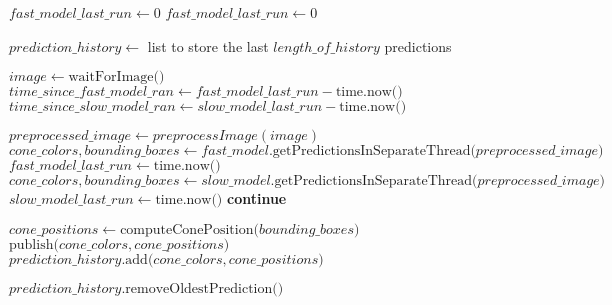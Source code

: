 
  \Input
  \EndInput
\State $fast\_model\_last\_run \gets \text{0}$
\State $fast\_model\_last\_run \gets \text{0}$

\State $prediction\_history \gets$ list to store the last $length\_of\_history$ predictions

	\State $image \gets \text{waitForImage()}$
	\State $time\_since\_fast\_model\_ran \gets fast\_model\_last\_run - \text{time.now()}$
	\State $time\_since\_slow\_model\_ran \gets slow\_model\_last\_run - \text{time.now()}$

    	\State $preprocessed\_image \gets preprocessImage(image)$
    	\State $cone\_colors, bounding\_boxes \gets fast\_model\text{.getPredictionsInSeparateThread(}preprocessed\_image\text{)}$
    	\State $fast\_model\_last\_run \gets \text{time.now()}$
    	\State $cone\_colors, bounding\_boxes \gets slow\_model\text{.getPredictionsInSeparateThread(}preprocessed\_image\text{)}$
    	\State $slow\_model\_last\_run \gets \text{time.now()}$
	\Else
		\State \textbf{continue}
	\EndIf

	\State $cone\_positions \gets \text{computeConePosition(}bounding\_boxes\text{)}$
	\State $\text{publish(} cone\_colors, cone\_positions\text{)}$
	\State $prediction\_history\text{.add(} cone\_colors, cone\_positions \text{)}$

		\State $prediction\_history\text{.removeOldestPrediction()}$
	\EndIf

\EndWhile
\EndProcedure
